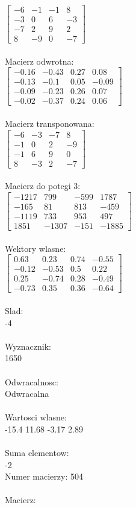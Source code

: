 \documentclass[a4paper,12pt]{article}
\begin{document}
$\begin{bmatrix} -6&-1&-1&8\\-3&0&6&-3\\-7&2&9&2\\8&-9&0&-7 \end{bmatrix}$
\\
\\
Macierz odwrotna:\\

$\begin{bmatrix} -0.16&-0.43&0.27&0.08\\-0.13&-0.1&0.05&-0.09\\-0.09&-0.23&0.26&0.07\\-0.02&-0.37&0.24&0.06 \end{bmatrix}$
\\
\\
Macierz transponowana:\\

$\begin{bmatrix} -6&-3&-7&8\\-1&0&2&-9\\-1&6&9&0\\8&-3&2&-7 \end{bmatrix}$
\\
\\
Macierz do potegi 3:\\

$\begin{bmatrix} -1217&799&-599&1787\\-165&81&813&-459\\-1119&733&953&497\\1851&-1307&-151&-1885 \end{bmatrix}$
\\
\\
Wektory wlasne:\\

$\begin{bmatrix} 0.63&0.23&0.74&-0.55\\-0.12&-0.53&0.5&0.22\\0.25&-0.74&0.28&-0.49\\-0.73&0.35&0.36&-0.64 \end{bmatrix}$
\\
\\
Slad:\\
-4
\\
\\
Wyznacznik:\\
1650
\\
\\
Odwracalnosc:\\
Odwracalna
\\
\\
Wartosci wlasne:\\
-15.4 11.68 -3.17 2.89
\\
\\
Suma elementow:\\
-2
\\
\newpage
Numer macierzy:
504
\\
\\
Macierz:\\
\end{document}

